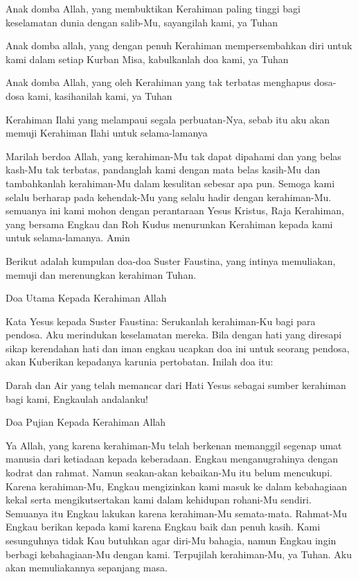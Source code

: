 \documentclass[a5paper,headsepline,titlepage,11pt,nnormalheadings,DIVcalc]{scrbook}
\begin{document}
Anak domba Allah, yang membuktikan Kerahiman paling tinggi bagi keselamatan dunia dengan salib-Mu,
sayangilah kami, ya Tuhan

Anak domba allah, yang dengan penuh Kerahiman mempersembahkan diri untuk kami dalam setiap Kurban Misa,
kabulkanlah doa kami, ya Tuhan

Anak domba Allah, yang oleh Kerahiman yang tak terbatas menghapus dosa-dosa kami,
kasihanilah kami, ya Tuhan

Kerahiman Ilahi yang melampaui segala perbuatan-Nya,
sebab itu aku akan memuji Kerahiman Ilahi untuk selama-lamanya

Marilah berdoa
Allah, yang kerahiman-Mu tak dapat dipahami dan yang belas kash-Mu tak terbatas, pandanglah kami dengan mata belas kasih-Mu dan tambahkanlah kerahiman-Mu dalam kesulitan sebesar apa pun. Semoga kami selalu berharap pada kehendak-Mu yang selalu hadir dengan kerahiman-Mu. semuanya ini kami mohon dengan perantaraan Yesus Kristus, Raja Kerahiman, yang bersama Engkau dan Roh Kudus menurunkan Kerahiman kepada kami untuk selama-lamanya. Amin

Berikut adalah kumpulan doa-doa Suster Faustina, yang intinya memuliakan, memuji dan merenungkan kerahiman Tuhan.

Doa Utama Kepada Kerahiman Allah

Kata Yesus kepada Suster Faustina:
Serukanlah kerahiman-Ku bagi para pendosa. Aku merindukan keselamatan mereka. Bila dengan hati yang diresapi sikap kerendahan hati dan iman engkau ucapkan doa ini untuk seorang pendosa, akan Kuberikan kepadanya karunia pertobatan. Inilah doa itu:

Darah dan Air yang telah memancar dari Hati Yesus sebagai sumber kerahiman bagi kami, Engkaulah andalanku!

Doa Pujian Kepada Kerahiman Allah

Ya Allah, yang karena kerahiman-Mu telah berkenan memanggil segenap umat manusia dari ketiadaan kepada keberadaan.
Engkau menganugrahinya dengan kodrat dan rahmat. Namun seakan-akan kebaikan-Mu itu belum mencukupi. Karena kerahiman-Mu, Engkau mengizinkan kami masuk ke dalam kebahagiaan kekal serta mengikutsertakan kami dalam kehidupan rohani-Mu sendiri. Semuanya itu Engkau lakukan karena kerahiman-Mu semata-mata. Rahmat-Mu Engkau berikan kepada kami karena Engkau baik dan penuh kasih.
Kami sesunguhnya tidak Kau butuhkan agar diri-Mu bahagia, namun Engkau ingin berbagi kebahagiaan-Mu dengan kami. Terpujilah kerahiman-Mu, ya Tuhan. Aku akan memuliakannya sepanjang masa.
\end{document}
